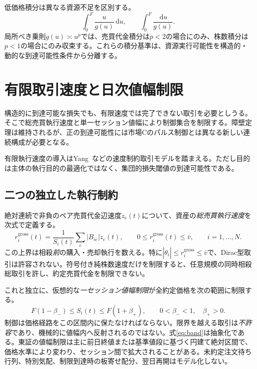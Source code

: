 \documentclass[11pt]{article}
\numberwithin{equation}{section}
\theoremstyle{definition}
\theoremstyle{remark}
\newcommand{\dd}{\,\mathrm{d}}
\begin{document}
低価格積分は異なる資源不足を区別する。
\begin{equation}\label{eq:lowprice}
\int_0^F\frac{u}{g(u)}\dd u,\qquad
\int_0^F\frac{\dd u}{g(u)}.
\end{equation}
局所べき乗則$g(u)\asymp u^p$では、売買代金積分は$p<2$の場合にのみ、株数積分は$p<1$の場合にのみ収束する。これらの積分基準は、資源実行可能性を構造的・動的な到達可能性条件から分離する。


\section{有限取引速度と日次値幅制限}\label{sec:rateband}
構造的に到達可能な損失でも、有限速度では完了できない取引を必要としうる。そこで総売買執行速度と単一セッション値幅により制御集合を制限する。障壁定理は維持されるが、正の到達可能性には市場Cのパルス制御とは異なる新しい連続構成が必要となる。

有限執行速度の導入はYang~\citep{Yang2019}などの速度制約取引モデルを踏まえる。ただし目的は主体の執行目的の最適化ではなく、集団的損失閾値の到達可能性である。

\subsection{二つの独立した執行制約}
絶対連続で非負のペア売買代金辺速度$\dot z_e(t)$について、資産の\emph{総売買執行速度}を次式で定義する。
\begin{equation}\label{eq:grossrate}
 r_i^{\mathrm{gross}}(t)=\frac{1}{S_i(t)}\sum_e |B_{ie}|\dot z_e(t),\qquad
 0\le r_i^{\mathrm{gross}}(t)\le\bar v,\qquad i=1,\ldots,N.
\end{equation}
この上界は相殺\emph{前}の購入・売却執行を数える。特に$|\dot\theta_i|\le r_i^{\mathrm{gross}}\le\bar v$で、Dirac型取引は許容されない。符号付き純株数速度だけを制限すると、任意規模の同時相殺総取引を許し、約定売買代金を制限できない。

これと独立に、仮想的な\emph{一セッション値幅制限}が全約定価格を次の範囲に制限する。
\begin{equation}\label{eq:band}
 F(1-\beta_-)\le S_i(t)\le F(1+\beta_+),\qquad
 0<\beta_-<1,\quad\beta_+>0.
\end{equation}
制御は価格経路をこの区間内に保たなければならない。限界を越える取引は\emph{不許容}であり、機械的に値幅内へ反射されるのではない。式\eqref{eq:band}は抽象化である。東証の値幅制限は主に前日終値または基準値段に基づく円建て絶対区間で、価格水準により変わり、セッション間で拡大されることがある\citep{JPX2026}。未約定注文待ち行列、特別気配、制限到達時の板寄せ配分、翌日再開はモデル化しない。
\end{document}
